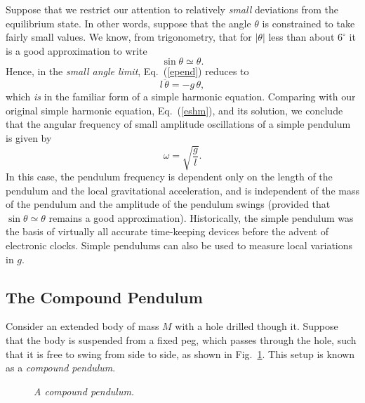 Suppose that
we restrict our attention to relatively {\em  small} deviations from the equilibrium state. In other
words, suppose that the angle $\theta$ is constrained to take fairly small values. We know,
from trigonometry, that for $|\theta|$ less than about $6^\circ$ it is a good approximation to
write
\begin{equation}
\sin\theta \simeq \theta.
\end{equation}
Hence, in the {\em small angle limit}, Eq.~(\ref{epend}) reduces to
\begin{equation}
l\,\ddot{\theta} = - g\,\theta,
\end{equation}
which {\em is} in the familiar form of a simple harmonic equation. Comparing with our original simple harmonic
equation, Eq.~(\ref{eshm}), and its solution, we conclude that the angular frequency of small amplitude
oscillations of a simple pendulum is given by
\begin{equation}
\omega = \sqrt{\frac{g}{l}}.
\end{equation}
In this case, the pendulum frequency is dependent only on the length of the pendulum and the local gravitational acceleration,
and is independent of the mass of the pendulum and the amplitude of the pendulum swings (provided that $\sin\theta\simeq \theta$ remains
a good approximation). Historically, 
the simple pendulum was the basis of virtually all accurate time-keeping devices before the
advent of electronic clocks. Simple pendulums can also be used to measure local variations in $g$.

\subsection{The Compound Pendulum}
Consider an extended body of mass $M$ with a hole drilled though it. Suppose that the body is suspended
from a fixed peg, which passes through the hole, such that it is free to swing from side to side,
as shown in Fig.~\ref{f99}. This setup is known as a {\em compound pendulum}.

\begin{figure}
\epsfysize=3in
\centerline{}
\caption{\em A compound pendulum.}\label{f99}  
\end{figure}

